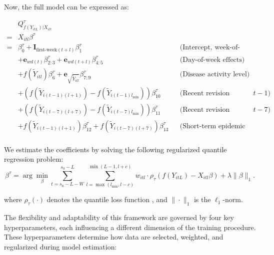 Now, the full model can be expressed as:

\begin{align*} 
 &Q_{f(Y_{itL})|X_{itl}}^{\tau} \\
= &X_{itl} \beta^{\tau} \\
= &\beta_0^{\tau} + \mathbf{I}_{\text{first-week}(t+l)} \beta_1^{\tau} 
&& \text{(Intercept, week-of-month effect)} \\
& + \mathbf{e}_{wd(t)} \beta_{2:3}^{\tau} + \mathbf{e}_{wd(t+l)} \beta_{4:5}^{\tau}
&& \text{(Day-of-week effects)} \\
& + f(\widetilde{Y}_{itl}) \beta_6^{\tau} + \mathbf{e}_{\sqrt{\widetilde{Y}_{itl}}} \beta_{7:9}^{\tau}
&& \text{(Disease activity level)} \\
&+ \left(f(\widetilde{Y}_{i(t-1)(l+1)}) - f(\widetilde{Y}_{i(t-1)l_{\text{min}}})\right) \beta_{10}^{\tau}
&& \text{(Recent revision magnitude, \(t{-}1\))} \\
&+ \left(f(\widetilde{Y}_{i(t-7)(l+7)}) - f(\widetilde{Y}_{i(t-7)l_{\text{min}}})\right) \beta_{11}^{\tau}
&& \text{(Recent revision magnitude, \(t{-}7\))} \\
& + f(\widetilde{Y}_{i(t-1)(l+1)}) \beta_{12}^{\tau} + f(\widetilde{Y}_{i(t-7)(l+7)}) \beta_{13}^{\tau}
&& \text{(Short-term epidemic trends)}\\
\end{align*}

We estimate the coefficients by solving the following regularized quantile regression problem:
\[
\beta^{\tau} = \arg\min_{\beta} \sum_{t = s_0 - L - W}^{s_0 - L} \sum_{l = \max(l_{\min}, l - c)}^{\min(L - 1, l + c)} w_{itl} \cdot \rho_\tau \left(f(Y_{itL}) - X_{itl} \beta\right) + \lambda \|\beta\|_1.
\]

where \( \rho_\tau(\cdot) \) denotes the quantile loss function \cite{Koenker1978}, and \( \|\cdot\|_1 \) is the \( \ell_1 \)-norm.
 
The flexibility and adaptability of this framework are governed by four key hyperparameters, each influencing a different dimension of the training procedure. These hyperparameters determine how data are selected, weighted, and regularized during model estimation:

